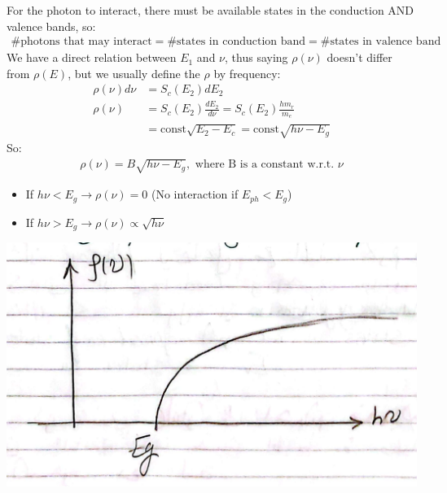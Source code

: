 \documentclass[11pt]{article}
\begin{document}
For the photon to interact, there must be available states in the conduction AND valence bands, so:
\begin{align*}
    \text{\# photons that may interact} = \text{\# states in conduction band} = \text{\# states in valence band}
\end{align*}
We have a direct relation between $E_1$ and $\nu$, thus saying $\rho(\nu)$ doesn't differ from $\rho(E)$, but we usually define the $\rho$ by frequency:
\begin{align*}
    \rho(\nu) d\nu &= S_c(E_2) dE_2 \\
    \rho(\nu) &= S_c(E_2) \frac{dE_2}{d\nu} = S_c(E_2) \frac{h m_r}{m_e} \\
    &= \text{const} \sqrt{E_2 - E_c} = \text{const} \sqrt{h \nu - E_g}
\end{align*}
So:\begin{align*}
    \rho(\nu) = B \sqrt{h \nu - E_g}, \text{ where B is a constant w.r.t. $\nu$}
\end{align*}
\begin{itemize}
    \item If $h \nu < E_g \rightarrow \rho(\nu) = 0$ (No interaction if $E_{ph} < E_g$)
    \item If $h \nu > E_g \rightarrow \rho(\nu) \propto \sqrt{h \nu}$
\end{itemize}
\begin{center}
    \includegraphics[scale=0.45]{7.png}
\end{center}
\end{document}
